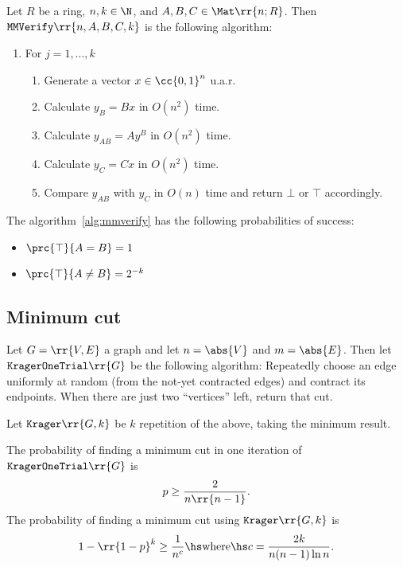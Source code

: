\documentclass{article}
\begin{document}
\begin{algorithm}\label{alg:mmverify}
  Let $R$ be a ring, $n,k\in\N$, and $A,B,C\in\Mat \rr{ n; R }$. Then
  $\texttt{MMVerify} \rr{ n, A, B, C, k }$ is the following algorithm:
  \begin{enumerate}
    \item For $j=1,...,k$ \begin{enumerate}
      \item Generate a vector $x\in \cc{ 0,1 }^n$ u.a.r.
      \item Calculate $y_B = Bx$ in $O(n^2)$ time.
      \item Calculate $y_{AB} = Ay^B$ in $O(n^2)$ time.
      \item Calculate $y_C = Cx$ in $O(n^2)$ time.
      \item Compare $y_{AB}$ with $y_C$ in $O(n)$ time and return $\bot$ or $\top$ accordingly.
    \end{enumerate}
\end{enumerate}
\end{algorithm}

\begin{theorem}
  \label{thm:mmverify-proabilities}
  The algorithm~\ref{alg:mmverify} has the following probabilities of success:
  \begin{itemize}
    \item $\prc{ \top}{A = B } = 1$
    \item $\prc{ \top}{A \not= B } = 2^{-k}$
  \end{itemize}
\end{theorem}

\subsection{Minimum cut}

\begin{algorithm}
  \label{alg:krager}
  Let $G= \rr{ V,E }$ a graph and let $n= \abs{ V }$ and $m= \abs{ E }$. Then let
  $\texttt{KragerOneTrial} \rr{ G }$ be the following algorithm: Repeatedly choose an edge
  uniformly at random (from the not-yet contracted edges) and contract its endpoints.
  When there are just two “vertices” left, return that cut.

  Let $ \texttt{Krager} \rr{ G, k }$ be $k$ repetition of the above, taking the minimum
  result.
\end{algorithm}

\begin{theorem}
  \label{thm:krager-probabilities}
  The probability of finding a minimum cut in one iteration of $ \texttt{KragerOneTrial} \rr{ G }$
  is
  \begin{align*}
    p \geq \frac{2}{n \rr{ n-1 }}.
  \end{align*}
  The probability of finding a minimum cut using $ \texttt{Krager} \rr{ G,k }$ is
  \begin{align*}
    1-\rr{ 1-p }^k \geq \frac{1}{n^c} \hs \text{where} \hs c = \frac{2k}{n(n-1)\ln n}.
  \end{align*}
\end{theorem}
\end{document}
